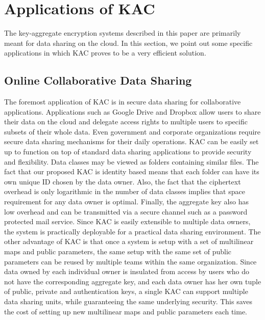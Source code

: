 \section{Applications of KAC}
\label{sec:applications}

The key-aggregate encryption systems described in this paper are primarily meant for data sharing on the cloud. In this section, we point out some specific applications in which KAC proves to be a very efficient solution.

\subsection*{Online Collaborative Data Sharing} The foremost application of KAC is in secure data sharing for collaborative applications. Applications such as Google Drive \cite{googledrive} and Dropbox \cite{dropbox} allow users to share their data on the cloud and delegate access rights to multiple users to specific subsets of their whole data. Even government and corporate organizations require secure data sharing mechanisms for their daily operations. KAC can be easily set up to function on top of standard data sharing applications to provide security and flexibility. Data classes may be viewed as folders containing similar files. The fact that our proposed KAC is identity based means that each folder can have its own unique ID chosen by the data owner. Also, the fact that the ciphertext overhead is only logarithmic in the number of data classes implies that space requirement for any data owner is optimal. Finally, the aggregate key also has low overhead and can be transmitted via a secure channel such as a password protected mail service. Since KAC is easily extensible to multiple data owners, the system is practically deployable for a practical data sharing environment. The other advantage of KAC is that once a system is setup with a set of multilinear maps and public parameters, the same setup with the same set of public parameters can be reused by multiple teams within the same organization. Since data owned by each individual owner is insulated from access by users who do not have the corresponding aggregate key, and each data owner has her own tuple of public, private and authentication keys, a single KAC can support multiple data sharing units, while guaranteeing the same underlying security. This saves the cost of setting up new multilinear maps and public parameters each time. 

